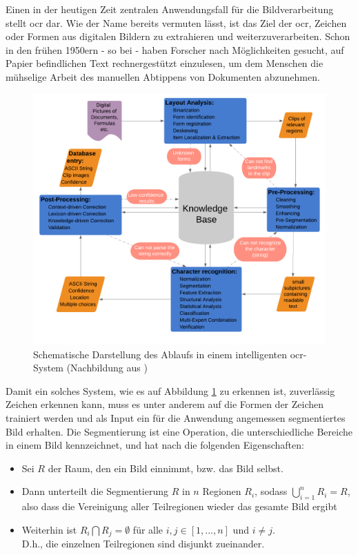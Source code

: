 	Einen in der heutigen Zeit zentralen Anwendungsfall für die Bildverarbeitung stellt \gls{ocr} dar. Wie der Name bereits vermuten lässt, ist das Ziel der \gls{ocr}, Zeichen oder Formen aus digitalen Bildern zu extrahieren und weiterzuverarbeiten. Schon in den frühen 1950ern - so bei \cite{cher-et-al-ocr} - haben Forscher nach Möglichkeiten gesucht, auf Papier befindlichen Text rechnergestützt einzulesen, um dem Menschen die mühselige Arbeit des manuellen Abtippens von Dokumenten abzunehmen.
	
	
	\begin{figure}[h]
		\centering
		\includegraphics[width=0.62\linewidth]{Ablauf-OCR_Cheriet-et-al.pdf}
		\caption[typisches \gls{ocr}-Ablaufschema]{Schematische Darstellung des 
		Ablaufs in einem intelligenten \gls{ocr}-System (Nachbildung aus 
		\cite[Seite 7]{cher-et-al-ocr})}
		\label{fig:ocr-system}
	\end{figure}

	Damit ein solches System, wie es auf Abbildung \ref{fig:ocr-system} zu 
	erkennen ist, zuverlässig Zeichen erkennen kann, muss es unter 
	anderem auf die Formen der Zeichen trainiert werden und als Input ein für 
	die Anwendung angemessen segmentiertes Bild erhalten. Die Segmentierung ist 
	eine Operation, die unterschiedliche Bereiche in einem Bild kennzeichnet, 
	und hat nach \cite[S. 690 f]{gonzalez-woods}
	die folgenden Eigenschaften:
	\begin{itemize}
		\item Sei $R$ der Raum, den ein Bild einnimmt, bzw. das Bild selbst.
		\item Dann unterteilt die Segmentierung $R$ in $n$ Regionen $R_{i}$, sodass $\bigcup\limits_{i=1}^{n} R_{i} = R$, also dass die Vereinigung aller Teilregionen wieder das gesamte Bild ergibt
		\item Weiterhin ist $R_{i} \bigcap R_{j} = \emptyset $ für alle $i, j \in [1, ... , n]$ und $i \neq j$. \\
		D.h., die einzelnen Teilregionen sind disjunkt zueinander.
	\end{itemize}
		